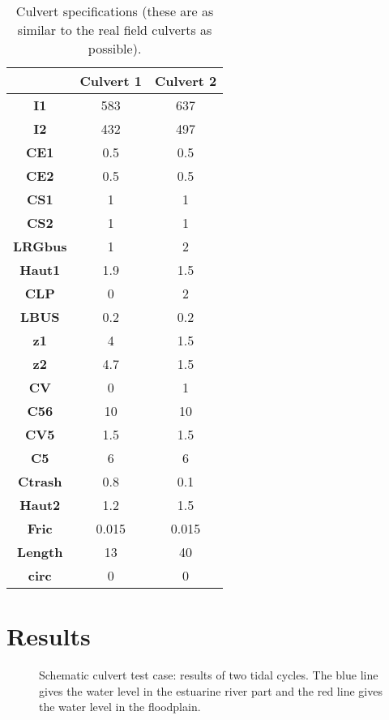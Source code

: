 \begin{table}[H]
\caption{Culvert specifications (these are as similar to the real field culverts as possible).}\label{tab:culvert_table1}
\begin{center}\begin{tabular}{|c|c|c|}
\hline
~ & \textbf{Culvert 1} & \textbf{Culvert 2} \\
\hline
\textbf{I1} & 583 & 637 \\
\hline
\textbf{I2}	& 432	 & 497 \\
\hline
\textbf{CE1}	& 0.5	 & 0.5 \\
\hline
\textbf{CE2}	& 0.5	 & 0.5 \\
\hline
\textbf{CS1}	& 1	 & 1 \\
\hline
\textbf{CS2}	& 1	 & 1 \\
\hline
\textbf{LRGbus}	& 1	 & 2 \\
\hline
\textbf{Haut1}	& 1.9	 & 1.5 \\
\hline
\textbf{CLP}	& 0	 & 2 \\
\hline
\textbf{LBUS}	& 0.2	 & 0.2 \\
\hline
\textbf{z1}	& 4	 & 1.5 \\
\hline
\textbf{z2}	& 4.7	 & 1.5 \\
\hline
\textbf{CV}	& 0	 & 1 \\
\hline
\textbf{C56}	& 10	 & 10 \\
\hline
\textbf{CV5}	& 1.5	 & 1.5 \\
\hline
\textbf{C5}	& 6	 & 6 \\
\hline
\textbf{Ctrash}	& 0.8	 & 0.1 \\
\hline
\textbf{Haut2}	& 1.2	 & 1.5 \\
\hline
\textbf{Fric}	& 0.015 & 0.015 \\
\hline
\textbf{Length}	& 13	 & 40 \\
\hline
\textbf{circ}	& 0	 & 0 \\
\hline
\end{tabular}\end{center}
\end{table}

\section{Results}

\begin{figure}[h]
\begin{center}
\end{center}
\caption{Schematic culvert test case: results of two tidal cycles.
The blue line gives the water level in the estuarine river part and the red line gives the water level in the floodplain.}
\label{fig:culvert_figure2}
\end{figure}

